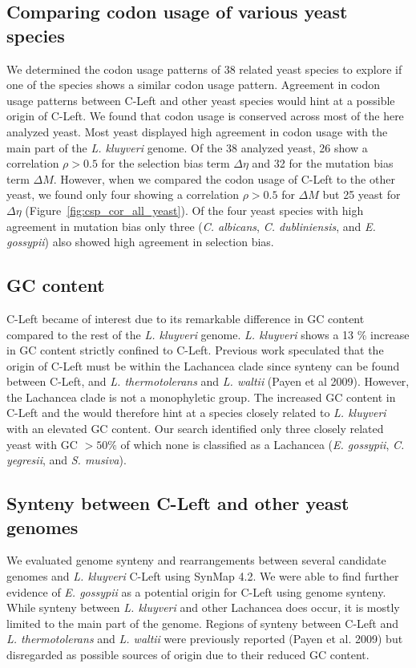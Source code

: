 \documentclass[letter,12pt]{article}
\begin{document}
\subsection*{Comparing codon usage of various yeast species}
We determined the codon usage patterns of 38 related yeast species to explore if one of the species shows a similar codon usage pattern.
Agreement in codon usage patterns between C-Left and other yeast species would hint at a possible origin of C-Left.
We found that codon usage is conserved across most of the here analyzed yeast. 
Most yeast displayed high agreement in codon usage with the main part of the \textit{L. kluyveri} genome. Of the 38 analyzed yeast, 26 show a correlation $\rho > 0.5$ for the selection bias term $\Delta \eta$ and 32 for the mutation bias term $\Delta M$.
However, when we compared the codon usage of C-Left to the other yeast, we found only four showing a correlation $\rho > 0.5$ for $\Delta M$ but 25 yeast for $\Delta \eta$ (Figure~\ref{fig:csp_cor_all_yeast}).
Of the four yeast species with high agreement in mutation bias only three (\textit{C. albicans}, \textit{C. dubliniensis}, and \textit{E. gossypii}) also showed high agreement in selection bias.

\subsection{GC content}
C-Left became of interest due to its remarkable difference in GC content compared to the rest of the \textit{L. kluyveri} genome.
\textit{L. kluyveri} shows a 13 \% increase in GC content strictly confined to C-Left. 
Previous work speculated that the origin of C-Left must be within the Lachancea clade since synteny can be found between C-Left, and \textit{L. thermotolerans} and \textit{L. waltii} (Payen et al 2009).
However, the Lachancea clade is not a monophyletic group.
The increased GC content in C-Left and the would therefore hint at a species closely related to \textit{L. kluyveri} with an elevated GC content. 
Our search identified only three closely related yeast with GC $> 50\%$ of which none is classified as a Lachancea (\textit{E. gossypii}, \textit{C. yegresii}, and \textit{S. musiva}).

\subsection*{Synteny between C-Left and other yeast genomes}

We evaluated genome synteny and rearrangements between several candidate genomes and \textit{L. kluyveri} C-Left using SynMap 4.2.
We were able to find further evidence of \textit{E. gossypii} as a potential origin for C-Left using genome synteny.
While synteny between \textit{L. kluyveri} and other Lachancea does occur, it is mostly limited to the main part of the genome.
Regions of synteny between C-Left and \textit{L. thermotolerans} and \textit{L. waltii} were previously reported (Payen et al. 2009) but disregarded as possible sources of origin due to their reduced GC content.
\end{document}
